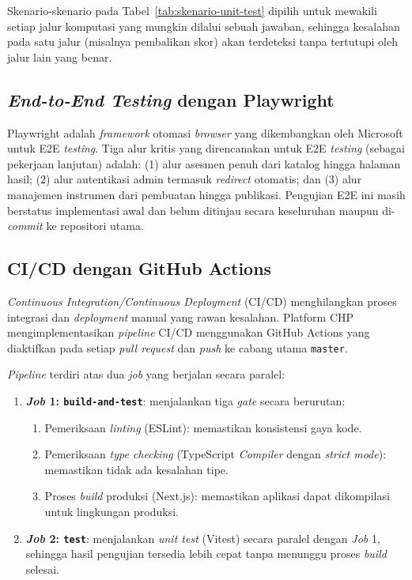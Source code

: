 Skenario-skenario pada Tabel~\ref{tab:skenario-unit-test} dipilih untuk mewakili setiap jalur komputasi yang mungkin dilalui sebuah jawaban, sehingga kesalahan pada satu jalur (misalnya pembalikan skor) akan terdeteksi tanpa tertutupi oleh jalur lain yang benar.

\subsection{\textit{End-to-End Testing} dengan Playwright}
\label{subsec:playwright}

Playwright adalah \textit{framework} otomasi \textit{browser} yang dikembangkan oleh Microsoft untuk E2E \textit{testing}. Tiga alur kritis yang direncanakan untuk E2E \textit{testing} (sebagai pekerjaan lanjutan) adalah: (1) alur asesmen penuh dari katalog hingga halaman hasil; (2) alur autentikasi admin termasuk \textit{redirect} otomatis; dan (3) alur manajemen instrumen dari pembuatan hingga publikasi. Pengujian E2E ini masih berstatus implementasi awal dan belum ditinjau secara keseluruhan maupun di-\textit{commit} ke repositori utama.

\subsection{CI/CD dengan GitHub Actions}
\label{subsec:cicd}

\textit{Continuous Integration/Continuous Deployment} (CI/CD) menghilangkan proses integrasi dan \textit{deployment} manual yang rawan kesalahan. Platform CHP mengimplementasikan \textit{pipeline} CI/CD menggunakan GitHub Actions yang diaktifkan pada setiap \textit{pull request} dan \textit{push} ke cabang utama \texttt{master}.

\textit{Pipeline} terdiri atas dua \textit{job} yang berjalan secara paralel:

\begin{enumerate}[leftmargin=2cm]
  \item \textbf{\textit{Job} 1: \texttt{build-and-test}}: menjalankan tiga \textit{gate} secara berurutan:
  \begin{enumerate}
    \item Pemeriksaan \textit{linting} (ESLint): memastikan konsistensi gaya kode.
    \item Pemeriksaan \textit{type checking} (TypeScript \textit{Compiler} dengan \textit{strict mode}): memastikan tidak ada kesalahan tipe.
    \item Proses \textit{build} produksi (Next.js): memastikan aplikasi dapat dikompilasi untuk lingkungan produksi.
  \end{enumerate}
  \item \textbf{\textit{Job} 2: \texttt{test}}: menjalankan \textit{unit test} (Vitest) secara paralel dengan \textit{Job} 1, sehingga hasil pengujian tersedia lebih cepat tanpa menunggu proses \textit{build} selesai.
\end{enumerate}

